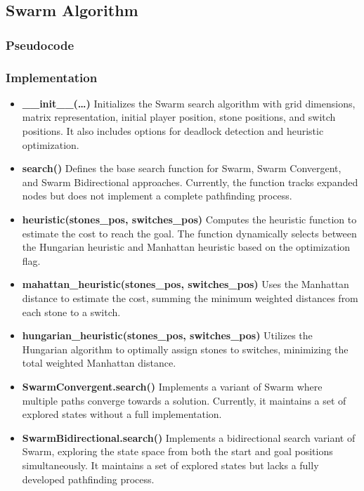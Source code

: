 \subsection{Swarm Algorithm}

\subsubsection{Pseudocode}

\subsubsection{Implementation}
\begin{itemize}
    \item \textbf{\_\_init\_\_(\ldots)}
          Initializes the Swarm search algorithm with grid dimensions, matrix representation, initial player position, stone positions, and switch positions. It also includes options for deadlock detection and heuristic optimization.

    \item \textbf{search()}
          Defines the base search function for Swarm, Swarm Convergent, and Swarm Bidirectional approaches. Currently, the function tracks expanded nodes but does not implement a complete pathfinding process.

    \item \textbf{heuristic(stones\_pos, switches\_pos)}
          Computes the heuristic function to estimate the cost to reach the goal. The function dynamically selects between the Hungarian heuristic and Manhattan heuristic based on the optimization flag.

    \item \textbf{mahattan\_heuristic(stones\_pos, switches\_pos)}
          Uses the Manhattan distance to estimate the cost, summing the minimum weighted distances from each stone to a switch.

    \item \textbf{hungarian\_heuristic(stones\_pos, switches\_pos)}
          Utilizes the Hungarian algorithm to optimally assign stones to switches, minimizing the total weighted Manhattan distance.

    \item \textbf{SwarmConvergent.search()}
          Implements a variant of Swarm where multiple paths converge towards a solution. Currently, it maintains a set of explored states without a full implementation.

    \item \textbf{SwarmBidirectional.search()}
          Implements a bidirectional search variant of Swarm, exploring the state space from both the start and goal positions simultaneously. It maintains a set of explored states but lacks a fully developed pathfinding process.


\end{itemize}
